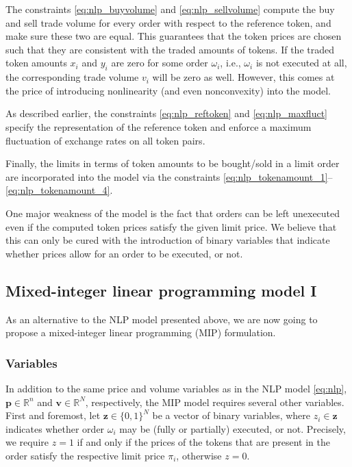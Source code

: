 \documentclass[11pt,parskip=full]{scrartcl}%
\newcommand*{\ie}{i.e., }
\newcommand*{\wrt}{with respect to }
\begin{document}
The constraints \eqref{eq:nlp_buyvolume} and \eqref{eq:nlp_sellvolume} compute the buy and sell
trade volume for every order \wrt the reference token, and make sure these two are equal.
This guarantees that the token prices are chosen such that they are consistent with the traded
amounts of tokens.
If the traded token amounts $ x_i $ and $ y_i $ are zero for some order $ \omega_i $, \ie
$ \omega_i $ is not executed at all, the corresponding trade volume $ v_i $ will be zero as well.
However, this comes at the price of introducing nonlinearity (and even nonconvexity) into the
model.

As described earlier, the constraints \eqref{eq:nlp_reftoken} and \eqref{eq:nlp_maxfluct} specify
the representation of the reference token and enforce a maximum fluctuation of exchange rates on
all token pairs.

Finally, the limits in terms of token amounts to be bought/sold in a limit order are incorporated
into the model via the constraints \eqref{eq:nlp_tokenamount_1}--\eqref{eq:nlp_tokenamount_4}.

One major weakness of the model is the fact that orders can be left unexecuted even if the computed
token prices satisfy the given limit price.
We believe that this can only be cured with the introduction of binary variables that indicate
whether prices allow for an order to be executed, or not.


\subsection{Mixed-integer linear programming model I}
\label{subsec:MIPmodel_1}

As an alternative to the NLP model presented above, we are now going to propose a
mixed-integer linear programming (MIP) formulation.

\subsubsection*{Variables}

In addition to the same price and volume variables as in the NLP model \eqref{eq:nlp},
$ \mathbf{p} \in \mathbb{R}^n $ and $ \mathbf{v} \in \mathbb{R}^N $, respectively, the MIP model
requires several other variables.
First and foremost, let $ \mathbf{z} \in \{0,1\}^N $ be a vector of binary variables, where $ z_i
\in \mathbf{z} $ indicates whether order $ \omega_i $ may be (fully or partially) executed, or not.
Precisely, we require $ z = 1 $ if and only if the prices of the tokens that are present in the
order satisfy the respective limit price $ \pi_i $, otherwise $ z = 0 $.
\end{document}
